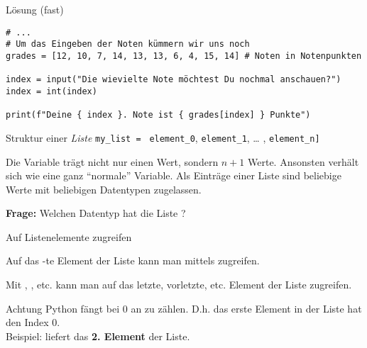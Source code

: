 \begin{fragile}{}
\begin{block}{Lösung \footnotesize(fast)}
\begin{verbatim}
# ...
# Um das Eingeben der Noten kümmern wir uns noch
grades = [12, 10, 7, 14, 13, 13, 6, 4, 15, 14] # Noten in Notenpunkten

index = input("Die wievielte Note möchtest Du nochmal anschauen?")
index = int(index)

print(f"Deine { index }. Note ist { grades[index] } Punkte")
\end{verbatim}
\end{block}
\end{fragile}


\begin{fragile}

\begin{block}{Struktur einer \emph{Liste}}
\vspace{2pt}
\large
\texttt{my\_list = }\pause {\Large\texttt{[}}\pause 
\texttt{element\_0}\pause,
\pause 
\texttt{element\_1}, \pause 
 \dots   
, \texttt{element\_n}\pause \Large{\texttt{]}}
\end{block}

\pause 

Die Variable  trägt nicht nur einen Wert, sondern $n+1$ Werte. Ansonsten verhält sich  wie eine ganz \enquote{normale} Variable. 
Als Einträge einer Liste sind beliebige Werte mit beliebigen Datentypen zugelassen. 


\vspace{12pt}

\pause

\textbf{Frage:} Welchen Datentyp hat die Liste \py{[2, 2.3, "Hello"]} ? 
	
\end{fragile}

\begin{frame}
	
\begin{block}{Auf Listenelemente zugreifen}
	
\vspace{2pt}

Auf das -te Element der Liste  kann man mittels  zugreifen. 

\pause 

Mit , , etc. kann man auf das letzte, vorletzte, etc. Element 
der Liste zugreifen. 

\end{block}

\pause 
\vspace{12pt}

\begin{alertblock}{Achtung}
\vspace{2pt}
Python fängt bei 0 an zu zählen. D.h. das erste Element in der Liste hat den Index 0. \\
Beispiel:  liefert das \textbf{2. Element} der Liste. 
\end{alertblock}

	
\end{frame}	


